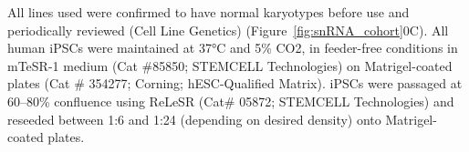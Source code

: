 All lines used were confirmed to have normal karyotypes before use and periodically reviewed (Cell Line Genetics) (Figure~\ref{fig:snRNA_cohort}0C). All human iPSCs were maintained at 37°C and 5\% CO2, in feeder-free conditions in mTeSR-1 medium (Cat \#85850; STEMCELL Technologies) on Matrigel-coated plates (Cat \# 354277; Corning; hESC-Qualified Matrix). iPSCs were passaged at 60–80\% confluence using ReLeSR (Cat\# 05872; STEMCELL Technologies) and reseeded between 1:6 and 1:24 (depending on desired density) onto Matrigel-coated plates.